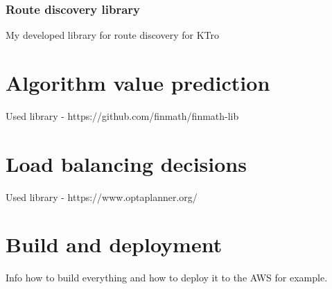 \subsubsection{Route discovery library}
My developed library for route discovery for KTro

\section{Algorithm value prediction}\label{sec:algorithm-value-prediction}

Used library - https://github.com/finmath/finmath-lib

\section{Load balancing decisions}\label{sec:load-balancing-decisions}

Used library - https://www.optaplanner.org/

\section{Build and deployment}\label{sec:build-and-deployment}
Info how to build everything and how to deploy it to the AWS for example.